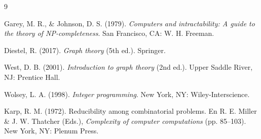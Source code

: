 \begin{thebibliography}{9}

Garey, M. R., \& Johnson, D. S. (1979). 
\textit{Computers and intractability: A guide to the theory of NP-completeness}. 
San Francisco, CA: W. H. Freeman. 

Diestel, R. (2017). 
\textit{Graph theory} (5th ed.). 
Springer. 

West, D. B. (2001). 
\textit{Introduction to graph theory} (2nd ed.). 
Upper Saddle River, NJ: Prentice Hall. 

Wolsey, L. A. (1998). 
\textit{Integer programming}. 
New York, NY: Wiley-Interscience. 

Karp, R. M. (1972). 
Reducibility among combinatorial problems. En R. E. Miller \& J. W. Thatcher (Eds.), 
\textit{Complexity of computer computations} (pp. 85–103). 
New York, NY: Plenum Press. 

\end{thebibliography}